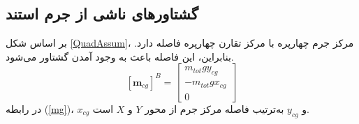 \subsection{گشتاورهای ناشی از جرم استند}\label{sec:mgmoent}
بر اساس شکل
\ref{QuadAssum}،
مرکز جرم چهارپره با مرکز تقارن چهارپره فاصله دارد. بنابراین، این فاصله باعث به وجود آمدن گشتاور می‌شود.
\begin{equation}\label{mg}
	[\boldsymbol m_ {cg}]^B = \begin{bmatrix}
		m_{tot}gy_{cg} \\
		-m_{tot}gx_{cg} \\
		0
	\end{bmatrix}
\end{equation}
در رابطه
(\ref{mg})،
$x_{cg}$
و
$y_{cg}$
به‌ترتیب فاصله مرکز جرم از محور $Y$ و $X$ است.